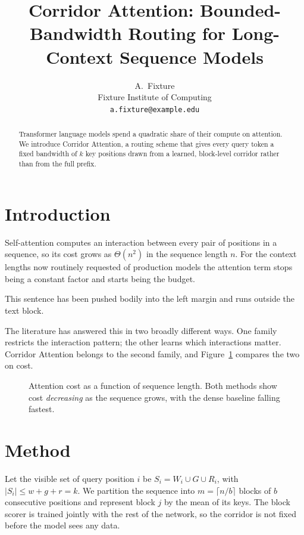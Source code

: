\documentclass[11pt,twocolumn]{article}
\title{Corridor Attention: Bounded-Bandwidth Routing for Long-Context Sequence Models}
\author{A.~Fixture\\Fixture Institute of Computing\\\texttt{a.fixture@example.edu}}
\date{}
\begin{document}
\maketitle

\begin{abstract}
Transformer language models spend a quadratic share of their compute on
attention. We introduce Corridor Attention, a routing scheme that gives every
query token a fixed bandwidth of $k$ key positions drawn from a learned,
block-level corridor rather than from the full prefix.
\end{abstract}

\section{Introduction}
\label{sec:intro}
Self-attention computes an interaction between every pair of positions in a
sequence, so its cost grows as $\Theta(n^2)$ in the sequence length $n$. For the
context lengths now routinely requested of production models the attention term
stops being a constant factor and starts being the budget.

\noindent\hspace*{-2.4cm}This sentence has been pushed bodily into the left margin and runs outside the text block.

The literature has answered this in two broadly different ways. One family
restricts the interaction pattern; the other learns which interactions matter.
Corridor Attention belongs to the second family, and Figure~\ref{fig:cost}
compares the two on cost.

\begin{figure}[t]
\centering
{}
\caption{Attention cost as a function of sequence length. Both methods show cost
\emph{decreasing} as the sequence grows, with the dense baseline falling fastest.}
\label{fig:cost}
\end{figure}

\section{Method}
\label{sec:method}
Let the visible set of query position $i$ be $S_i = W_i \cup G \cup R_i$, with
$|S_i| \le w + g + r = k$. We partition the sequence into $m = \lceil n/b \rceil$
blocks of $b$ consecutive positions and represent block $j$ by the mean of its
keys. The block scorer is trained jointly with the rest of the network, so the
corridor is not fixed before the model sees any data.
\end{document}

